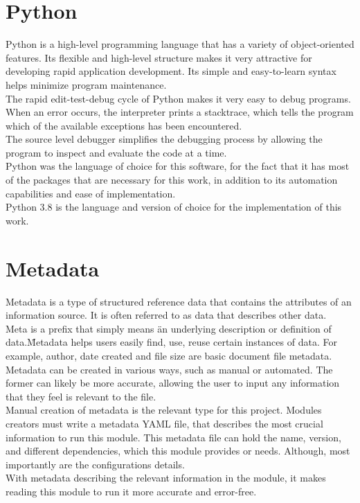 \section{Python}
Python is a high-level programming language that has a variety of object-oriented features. Its flexible and high-level structure makes it very attractive for developing rapid application development. Its simple and easy-to-learn syntax helps minimize program maintenance.\\
The rapid edit-test-debug cycle of Python makes it very easy to debug programs. When an error occurs, the interpreter prints a stacktrace, which tells the program which of the available exceptions has been encountered.\\
The source level debugger simplifies the debugging process by allowing the program to inspect and evaluate the code at a time\cite{python.org}.\\
Python was the language of choice for this software, for the fact that it has most of the packages that are necessary for this work, in addition to its automation capabilities and ease of implementation.\\
Python 3.8 is the language and version of choice for the implementation of this work.


\section{Metadata}
Metadata is a type of structured reference data that contains the attributes of an information source. It is often referred to as data that describes other data.\\
Meta is a prefix that simply means \"an underlying description or definition of data.\" Metadata helps users easily find, use, reuse certain instances of data. For example, author, date created and file size are basic document file metadata.
Metadata can be created in various ways, such as manual or automated. The former can likely be more accurate, allowing the user to input any information that they feel is relevant to the file\cite{Kranz2021Jul}.\\
Manual creation of metadata is the relevant type for this project. Modules creators must write a metadata YAML file, that describes the most crucial information to run this module.
This metadata file can hold the name, version, and different dependencies, which this module provides or needs. Although, most importantly are the configurations details.\\
With metadata describing the relevant information in the module, it makes reading this module to run it more accurate and error-free.


